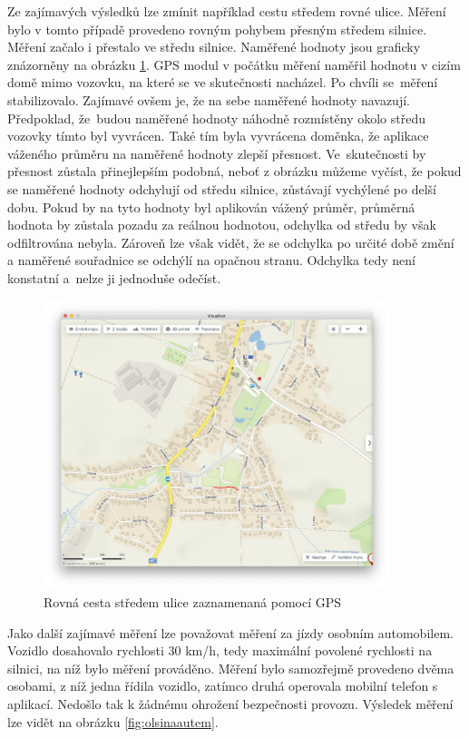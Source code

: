 \documentclass[czech, bachelor]{diploma}
\begin{document}
Ze zajímavých výsledků lze zmínit například cestu středem rovné ulice. Měření bylo v tomto případě provedeno rovným pohybem
přesným středem silnice. Měření začalo i přestalo ve středu silnice. Naměřené hodnoty jsou graficky znázorněny na obrázku
\ref{fig:louky}. GPS modul v počátku měření naměřil hodnotu v cizím domě mimo vozovku, na které se ve skutečnosti nacházel.
Po chvíli se~měření stabilizovalo. Zajímavé ovšem je, že na sebe naměřené hodnoty navazují. Předpoklad, že~budou naměřené hodnoty
náhodně rozmístěny okolo středu vozovky tímto byl vyvrácen. Také tím byla vyvrácena doměnka, že aplikace váženého průměru
na naměřené hodnoty zlepší přesnost. Ve~skutečnosti by přesnost zůstala přinejlepším podobná, neboť z obrázku můžeme vyčíst, že
pokud se naměřené hodnoty odchylují od středu silnice, zůstávají vychýlené po delší dobu. Pokud by na tyto hodnoty byl aplikován
vážený průměr, průměrná hodnota by zůstala pozadu za reálnou hodnotou, odchylka od středu by však odfiltrována nebyla.
Zároveň lze však vidět, že se odchylka po určité době změní a naměřené souřadnice se odchýlí na opačnou stranu. Odchylka tedy není
konstatní a~nelze ji jednoduše odečíst.

\begin{figure}
    \centering
    \includegraphics[width=0.9\textwidth]{Figures/louky.png}
    \caption{Rovná cesta středem ulice zaznamenaná pomocí GPS}
    \label{fig:louky}
\end{figure}

Jako další zajímavé měření lze považovat měření za jízdy osobním automobilem. Vozidlo dosahovalo rychlosti 30 km/h, tedy maximální
povolené rychlosti na silnici, na níž bylo měření prováděno. Měření bylo samozřejmě provedeno dvěma osobami, z níž
jedna řídila vozidlo, zatímco druhá operovala mobilní telefon s aplikací. Nedošlo tak k žádnému ohrožení bezpečnosti provozu.
Výsledek měření lze vidět na obrázku \ref{fig:olsinaautem}.
\end{document}
